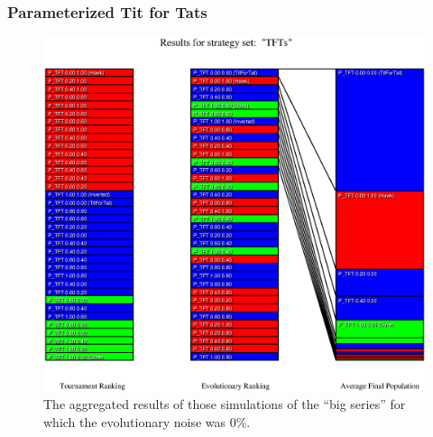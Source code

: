 \newpage
\subsubsection{Parameterized Tit for Tats}
\begin{small}

\end{small}

\begin{figure}
\begin{center}
\includegraphics[width=20cm]{tables/TFTs_N0.000.eps}
\caption{\label{TFTs_N0000} The aggregated results of those
simulations of the ``big series'' for which the evolutionary noise was 0\%.}
\end{center}
\end{figure}

